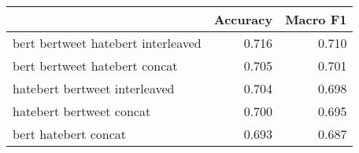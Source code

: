 \begin{tabular}{lrr}
\toprule
{} &  Accuracy &  Macro F1 \\
\midrule
bert bertweet hatebert interleaved  &     0.716 &     0.710 \\
bert bertweet hatebert concat       &     0.705 &     0.701 \\
hatebert bertweet interleaved       &     0.704 &     0.698 \\
hatebert bertweet concat            &     0.700 &     0.695 \\
bert hatebert concat                &     0.693 &     0.687 \\
\bottomrule
\end{tabular}
